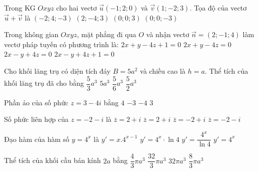\begin{ex}%
Trong KG $Oxyz$ cho hai vectơ $\vec{u}(-1; 2; 0)$ và $\vec{v}(1;-2; 3)$. Tọa độ của vectơ $\vec{u}+\vec{v}$ là
\choice
{$(-2; 4;-3)$}
{$(2;-4; 3)$}
{\True $(0; 0; 3)$}
{$(0; 0;-3)$}

\end{ex}
\begin{ex}%
{\vspace{-0.5cm}

}

\end{ex}
\begin{ex}%
Trong không gian $O x y z$, mặt phẳng đi qua $O$ và nhận vectơ $\vec{n}=(2;-1; 4)$ làm vectơ pháp tuyến có phương trình là:
\choice
{$2 x+y-4 z+1=0$}
{$2 x+y-4 z=0$}
{\True $2 x-y+4 z=0$}
{$2 x-y+4 z+1=0$}

\end{ex}
\begin{ex}%
Cho khối lăng trụ có diện tích đáy $B=5 a^2$ và chiều cao là $h=a$. Thể tích của khối lăng trụ đã cho bằng
\choice
{$\dfrac{5}{3} a^3$}
{\True $5 a^3$}
{$\dfrac{5}{6} a^3$}
{$\dfrac{5}{2} a^3$}

\end{ex}
\begin{ex}%
Phần ảo của số phức $z=3-4 i$ bằng
\choice
{$4$}
{$-3$}
{\True $-4$}
{$3$}

\end{ex}
\begin{ex}%
Số phức liên hợp của $z=-2-i$ là
\choice
{\True $\bar{z}=2+i$}
{$\bar{z}=2+i$}
{$\bar{z}=-2+i$}
{$\bar{z}=-2-i$}

\end{ex}
\begin{ex}%
Đạo hàm của hàm số $y=4^{x}$ là
\choice
{$y'=x.4^{x-1}$}
{\True $y'=4^{x} \cdot \ln 4$}
{$y'=\dfrac{4^{x}}{\ln 4}$}
{$y'=4^{x}$}

\end{ex}
\begin{ex}%
Thể tích của khối cầu bán kính $2 a$ bằng
\choice
{$\dfrac{4}{3} \pi a^3$}
{\True $\dfrac{32}{3} \pi a^3$}
{$32\pi a^3$}
{$\dfrac{8}{3} \pi a^3$}

\end{ex}
